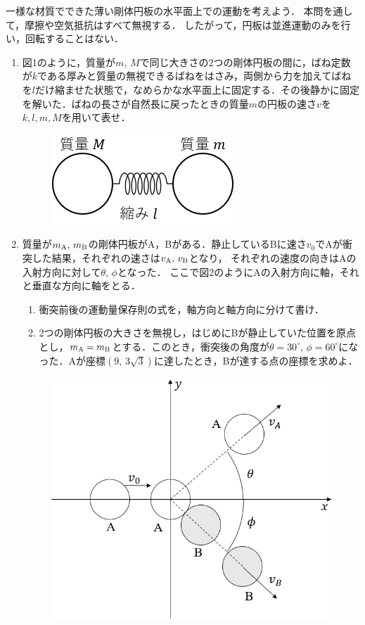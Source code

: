 \setcounter{figure}{0}
一様な材質でできた薄い剛体円板の水平面上での運動を考えよう．
本問を通して，摩擦や空気抵抗はすべて無視する．
したがって，円板は並進運動のみを行い，回転することはない．

\begin{enumerate}
  \setlength{\leftskip}{-1zw}
  \setlength{\itemindent}{1zw}\setlength{\labelsep}{0.5zw}
  \setlength{\labelwidth}{1zw}\setlength{\leftmargin}{1zw}
  \setlength{\itemsep}{0.5\baselineskip}
  \item 図1のように，質量が$m,\,M$で同じ大きさの2つの剛体円板の間に，ばね定数が$k$である厚みと質量の無視できるばねをはさみ，両側から力を加えてばねを$l$だけ縮ませた状態で，なめらかな水平面上に固定する．その後静かに固定を解いた．ばねの長さが自然長に戻ったときの質量$m$の円板の速さ$v$を$k,l,m,M$を用いて表せ．
  \begin{figure}[H]
    \centering
    \includegraphics[width=.3\columnwidth]{../graphs/open_19_8_1-1.png}
    \caption{}
  \end{figure}
  \item 質量が$m_{\rm A},\,m_{\rm B}$の剛体円板がA，Bがある．静止しているBに速さ$v_0$でAが衝突した結果，それぞれの速さは$v_{\rm A},\,v_{\rm B}$となり，
  それぞれの速度の向きはAの入射方向に対して$\theta,\,\phi$となった．
  ここで図2のようにAの入射方向に\x 軸，それと垂直な方向に\y 軸をとる．
  \begin{enumerate}[（1）]
    \setlength{\leftskip}{-2zw}
    \setlength{\itemindent}{1zw}\setlength{\labelsep}{1zw}
    \setlength{\labelwidth}{1zw}
    \item 衝突前後の運動量保存則の式を，\x 軸方向と\y 軸方向に分けて書け．
    \item 2つの剛体円板の大きさを無視し，はじめにBが静止していた位置を原点とし，$m_{\rm A}=m_{\rm B}$とする．このとき，衝突後の角度が$\theta=30^\circ,\,\phi=60^\circ$になった．Aが座標$(9,\,3\sqrt{3})$に達したとき，Bが達する点の座標を求めよ．
  \end{enumerate}
  \begin{figure}[H]
    \centering
    \includegraphics[width=.55\columnwidth]{../graphs/open_19_8_1-2.png}

\end{figure}
\end{enumerate}
